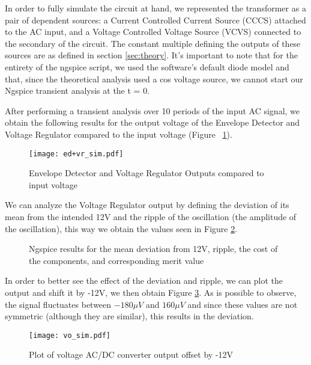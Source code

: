 \hspace{12pt} In order to fully simulate the circuit at hand, we represented the transformer as a pair of dependent sources: a Current Controlled Current Source (CCCS) attached to the AC input, and a Voltage Controlled Voltage Source (VCVS) connected to the secondary of the circuit. The constant multiple defining the outputs of these sources are as defined in section \ref{sec:theory}. It's important to note that for the entirety of the ngspice script, we used the software's default diode model and that, since the theoretical analysis used a cos voltage source, we cannot start our Ngspice transient analysis at the t = 0.

After performing a transient analysis over 10 periods of the input AC signal, we obtain the following results for the output voltage of the Envelope Detector and Voltage Regulator compared to the input voltage (Figure ~\ref{fig:ed_vr}).

\begin{figure}[h]
	\centering
        \texttt{[image: ed+vr\_sim.pdf]}
        \caption{Envelope Detector and Voltage Regulator Outputs compared to input voltage}
        \label{fig:ed_vr}
\end{figure}

We can analyze the Voltage Regulator output by defining the deviation of its mean from the intended 12V and the ripple of the oscillation (the amplitude of the oscillation), this way we obtain the values seen in Figure \ref{fig:sim_results}.

\begin{figure}[h]
	\centering
	\caption{Ngspice results for the mean deviation from 12V, ripple, the cost of the components, and corresponding merit value}
	\label{fig:sim_results}
\end{figure}

\pagebreak
In order to better see the effect of the deviation and ripple, we can plot the output and shift it by -12V, we then obtain Figure \ref{fig:sim_vo}. As is possible to observe, the signal fluctuates between $-180 \mu V$ and $160 \mu V$ and since these values are not symmetric (although they are similar), this results in the deviation.

\begin{figure}[h]
	\centering
	\texttt{[image: vo\_sim.pdf]}
	\caption{Plot of voltage AC/DC converter output offset by -12V}
	\label{fig:sim_vo}
\end{figure}

